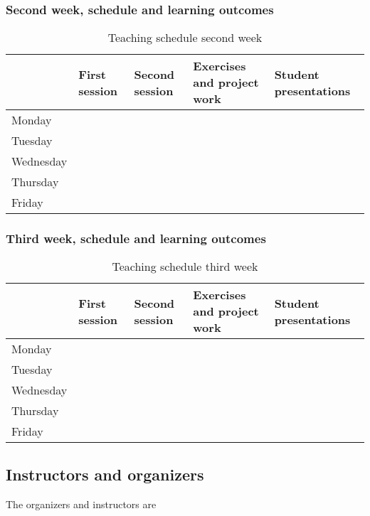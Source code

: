 \documentclass[superscriptaddress,amsmath,amssymb,aps,floatfix]{revtex4-2}
\begin{document}
\subsubsection{Second week, schedule and learning outcomes}


\begin{table}[hbtp]
\begin{tabular}{|l|l|l|l|l|} \hline
    & First session  & Second session  & Exercises and project work & Student presentations \\ \hline
  Monday & & & & \\
  Tuesday & & & & \\
  Wednesday & & & & \\
  Thursday & & & & \\
  Friday & & & & \\ \hline
\end{tabular}
\caption{Teaching schedule second  week}
\end{table}


\subsubsection{Third week, schedule and learning outcomes}


\begin{table}[hbtp]
\begin{tabular}{|l|l|l|l|l|} \hline
    & First session  & Second session  & Exercises and project work & Student presentations \\ \hline
  Monday & & & & \\
  Tuesday & & & & \\
  Wednesday & & & & \\
  Thursday & & & & \\
  Friday & & & & \\ \hline
\end{tabular}
\caption{Teaching schedule third  week}
\end{table}


\subsection{Instructors and organizers}\label{instructors-and-organizers}

The organizers and instructors are
\end{document}
